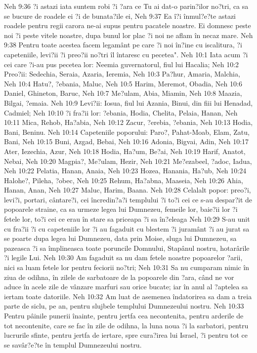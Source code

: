 Neh 9:36  ?i astazi iata suntem robi ?i ?ara ce Tu ai dat-o parin?ilor no?tri, ca sa se bucure de roadele ei ?i de bunata?ile ei,
Neh 9:37  Ea î?i înmul?e?te astazi roadele pentru regii carora ne-ai supus pentru pacatele noastre. Ei domnesc peste noi ?i peste vitele noastre, dupa bunul lor plac ?i noi ne aflam în necaz mare.
Neh 9:38  Pentru toate acestea facem legamânt pe care ?i noi în?ine cu iscalitura, ?i capeteniile, levi?ii ?i preo?ii no?tri îl întaresc cu pecetea".
Neh 10:1  Iata acum ?i cei care ?i-au pus pecetea lor: Neemia guvernatorul, fiul lui Hacalia;
Neh 10:2  Preo?ii: Sedechia, Seraia, Azaria, Ieremia,
Neh 10:3  Pa?hur, Amaria, Malchia,
Neh 10:4  Hatu?, ?ebania, Maluc,
Neh 10:5  Harim, Meremot, Obadia,
Neh 10:6  Daniel, Ghineton, Baruc,
Neh 10:7  Me?ulam, Abia, Miamin,
Neh 10:8  Maazia, Bilgai, ?emaia.
Neh 10:9  Levi?ii: Iosua, fiul lui Azania, Binui, din fiii lui Henadad, Cadmiel;
Neh 10:10  ?i fra?ii lor: ?ebania, Hodia, Chelita, Pelaia, Hanan,
Neh 10:11  Mica, Rehob, Ha?abia,
Neh 10:12  Zacur, ?erebia, ?ebania,
Neh 10:13  Hodia, Bani, Beninu.
Neh 10:14  Capeteniile poporului: Paro?, Pahat-Moab, Elam, Zatu, Bani,
Neh 10:15  Buni, Azgad, Bebai,
Neh 10:16  Adonia, Bigvai, Adin,
Neh 10:17  Ater, Iezechia, Azur,
Neh 10:18  Hodia, Ha?um, Be?ai,
Neh 10:19  Harif, Anatot, Nebai,
Neh 10:20  Magpia?, Me?ulam, Hezir,
Neh 10:21  Me?ezabeel, ?adoc, Iadua,
Neh 10:22  Pelatia, Hanan, Anaia,
Neh 10:23  Hozea, Hanania, Ha?ub,
Neh 10:24  Halohe?, Pileha, ?obec,
Neh 10:25  Rehum, Ha?abna, Maaseia,
Neh 10:26  Ahia, Hanan, Anan,
Neh 10:27  Maluc, Harim, Baana.
Neh 10:28  Celalalt popor: preo?i, levi?i, portari, cântare?i, cei încredin?a?i templului ?i to?i cei ce s-au despar?it de popoarele straine, ca sa urmeze legea lui Dumnezeu, femeile lor, baie?ii lor ?i fetele lor, to?i cei ce erau în stare sa priceapa ?i sa în?eleaga
Neh 10:29  S-au unit cu fra?ii ?i cu capeteniile lor ?i au fagaduit cu blestem ?i juramânt ?i au jurat sa se poarte dupa legea lui Dumnezeu, data prin Moise, sluga lui Dumnezeu, sa pazeasca ?i sa împlineasca toate poruncile Domnului, Stapânul nostru, hotarârile ?i legile Lui.
Neh 10:30  Am fagaduit sa nu dam fetele noastre popoarelor ?arii, nici sa luam fetele lor pentru feciorii no?tri;
Neh 10:31  Sa nu cumparam nimic în ziua de odihna, în zilele de sarbatoare de la popoarele din ?ara, când ne vor aduce în acele zile de vânzare marfuri sau orice bucate; iar în anul al ?aptelea sa iertam toate datoriile.
Neh 10:32  Am luat de asemenea îndatorirea sa dam a treia parte de siclu, pe an, pentru slujbele templului Dumnezeului nostru.
Neh 10:33  Pentru pâinile punerii înainte, pentru jertfa cea necontenita, pentru arderile de tot necontenite, care se fac în zile de odihna, la luna noua ?i la sarbatori, pentru lucrurile sfinte, pentru jertfa de iertare, spre cura?irea lui Israel, ?i pentru tot ce se savâr?e?te în templul Dumnezeului nostru.
